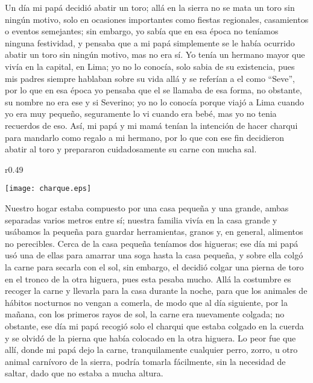 Un día mi papá decidió abatir un toro; allá en la sierra no se mata un toro sin ningún motivo, solo en ocasiones importantes como fiestas regionales, casamientos o eventos semejantes; sin embargo, yo sabía que en esa época no teníamos ninguna festividad, y pensaba que a mi papá simplemente se le había ocurrido abatir un toro sin ningún motivo, mas no era sí.
Yo tenía un hermano mayor que vivía en la capital, en Lima; yo no lo conocía, solo sabia de su existencia, pues mis padres siempre hablaban sobre su vida allá y se referían a el como ``Seve'', por lo que en esa época yo pensaba que el se llamaba de esa forma, no obstante, su nombre no era ese y si Severino; yo no lo conocía porque viajó a Lima cuando yo era muy pequeño, seguramente lo vi cuando era bebé, mas yo no tenia recuerdos de eso.
Así, mi papá y mi mamá tenían la intención de hacer charqui para mandarlo como regalo a mi hermano, por lo que con ese fin decidieron abatir al toro y prepararon cuidadosamente su carne con mucha sal.

\begin{wrapfigure}{r}{0.49\textwidth}
  \begin{center}
  \vspace{-20pt}
    \texttt{[image: charque.eps]}
  \end{center}
  \vspace{-20pt}
\end{wrapfigure}
Nuestro hogar estaba compuesto por una casa pequeña y una grande, ambas separadas varios metros entre sí; nuestra familia vivía en la casa grande y usábamos la pequeña para guardar herramientas, granos y, en general, alimentos no perecibles.
Cerca de la casa pequeña teníamos dos higueras; ese día mi papá usó una de ellas para amarrar una soga hasta la casa pequeña, y sobre ella colgó la carne para secarla con el sol, sin embargo, el decidió colgar una pierna de toro en el tronco de la otra higuera, pues esta pesaba mucho.
Allá la costumbre es recoger la carne y llevarla para la casa durante la noche, para que los animales de hábitos nocturnos no vengan a comerla, de modo que al día siguiente, por la mañana, con los primeros rayos de sol, la carne era nuevamente colgada; no obstante, ese día mi papá recogió solo el charqui que estaba colgado en la cuerda y se olvidó de la pierna que había colocado en la otra higuera.
Lo peor fue que allí, donde mi papá dejo la carne, tranquilamente cualquier perro, zorro, u otro animal carnívoro de la sierra, podría tomarla fácilmente, sin la necesidad de saltar, dado que no estaba a mucha altura.


